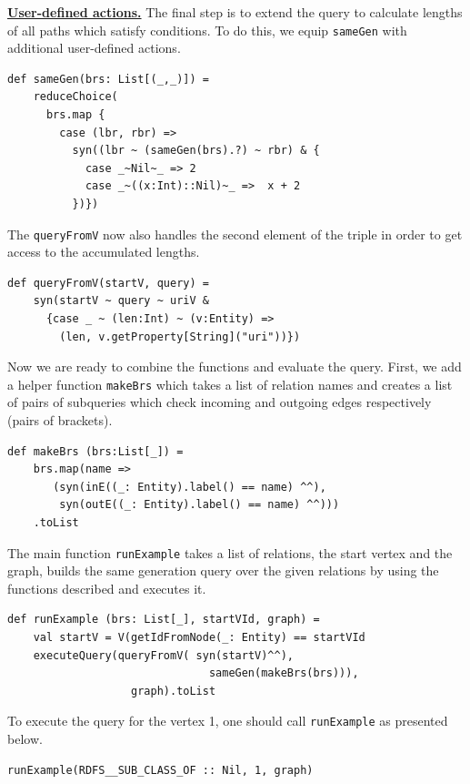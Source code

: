 \underline{\textbf{User-defined actions.}}
The final step is to extend the query to calculate lengths of all paths which satisfy conditions.
To do this, we equip \verb|sameGen| with additional user-defined actions.

\begin{lstlisting}
def sameGen(brs: List[(_,_)]) =
    reduceChoice(
      brs.map {
        case (lbr, rbr) =>
          syn((lbr ~ (sameGen(brs).?) ~ rbr) & {
            case _~Nil~_ => 2
            case _~((x:Int)::Nil)~_ =>  x + 2
          })})
\end{lstlisting}

The \verb|queryFromV| now also handles the second element of the triple in order to get access to the accumulated lengths.

\begin{lstlisting}
def queryFromV(startV, query) =
    syn(startV ~ query ~ uriV &
      {case _ ~ (len:Int) ~ (v:Entity) =>
        (len, v.getProperty[String]("uri"))})
\end{lstlisting}

Now we are ready to combine the functions and evaluate the query.
First, we add a helper function \verb|makeBrs| which takes a list of relation names and creates a list of pairs of subqueries which check incoming and outgoing edges respectively (pairs of brackets).

\begin{lstlisting}
def makeBrs (brs:List[_]) =
    brs.map(name =>
       (syn(inE((_: Entity).label() == name) ^^),
        syn(outE((_: Entity).label() == name) ^^)))
    .toList
\end{lstlisting}

The main function \verb|runExample| takes a list of relations, the start vertex and the graph, builds the same generation query over the given relations by using the functions described and executes it.

\begin{lstlisting}
def runExample (brs: List[_], startVId, graph) =
    val startV = V(getIdFromNode(_: Entity) == startVId
    executeQuery(queryFromV( syn(startV)^^),
                               sameGen(makeBrs(brs))),
                   graph).toList
\end{lstlisting}

To execute the query for the vertex 1, one should call \verb|runExample| as presented below.

\begin{lstlisting}
runExample(RDFS__SUB_CLASS_OF :: Nil, 1, graph)
\end{lstlisting}

